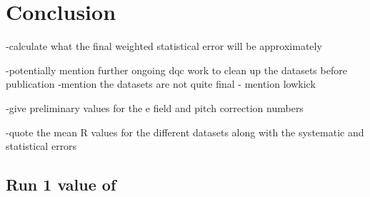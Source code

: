 
\thispagestyle{myheadings} %

\chapter{Conclusion}
\label{chapter:Conclusion}



-calculate what the final weighted statistical error will be approximately

-potentially mention further ongoing dqc work to clean up the datasets before publication
-mention the datasets are not quite final - mention lowkick

-give preliminary values for the e field and pitch correction numbers

-quote the mean R values for the different datasets along with the systematic and statistical errors





\section{Run 1 value of \amu}
\label{sec:FinalValue}



\cleardoublepage
